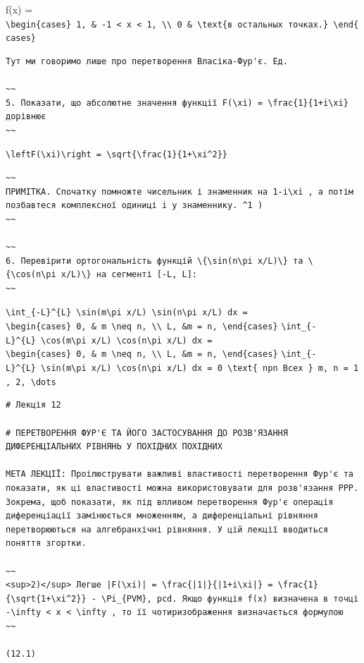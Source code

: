 \documentclass[
  ukrainian,
]{article}
\begin{document}
f(x) =
\texttt{\textbackslash{}begin\{cases\}\ 1,\ \&\ -1\ \textless{}\ x\ \textless{}\ 1,\ \textbackslash{}\textbackslash{}\ 0\ \&\ \textbackslash{}text\{в\ остальных\ точках.\}\ \textbackslash{}end\{cases\}}

\begin{verbatim}
Тут ми говоримо лише про перетворення Власіка-Фур'є. Ед.

~~
5. Показати, що абсолютне значення функції F(\xi) = \frac{1}{1+i\xi} дорівнює
~~
\end{verbatim}

\texttt{\textbackslash{}left\textbar{}F(\textbackslash{}xi)\textbackslash{}right\textbar{}\ =\ \textbackslash{}sqrt\{\textbackslash{}frac\{1\}\{1+\textbackslash{}xi\^{}2\}\}}

\begin{verbatim}
~~
ПРИМІТКА. Спочатку помножте чисельник і знаменник на 1-i\xi , а потім позбавтеся комплексної одиниці i у знаменнику. ^1 )
~~

~~
6. Перевірити ортогональність функцій \{\sin(n\pi x/L)\} та \{\cos(n\pi x/L)\} на сегменті [-L, L]:
~~
\end{verbatim}

\texttt{\textbackslash{}int\_\{-L\}\^{}\{L\}\ \textbackslash{}sin(m\textbackslash{}pi\ x/L)\ \textbackslash{}sin(n\textbackslash{}pi\ x/L)\ dx\ =}
\texttt{\textbackslash{}begin\{cases\}\ 0,\ \&\ m\ \textbackslash{}neq\ n,\ \textbackslash{}\textbackslash{}\ L,\ \&m\ =\ n,\ \textbackslash{}end\{cases\}}
\texttt{\textbackslash{}int\_\{-L\}\^{}\{L\}\ \textbackslash{}cos(m\textbackslash{}pi\ x/L)\ \textbackslash{}cos(n\textbackslash{}pi\ x/L)\ dx\ =}
\texttt{\textbackslash{}begin\{cases\}\ 0,\ \&\ m\ \textbackslash{}neq\ n,\ \textbackslash{}\textbackslash{}\ L,\ \&m\ =\ n,\ \textbackslash{}end\{cases\}}
\texttt{\textbackslash{}int\_\{-L\}\^{}\{L\}\ \textbackslash{}sin(m\textbackslash{}pi\ x/L)\ \textbackslash{}cos(n\textbackslash{}pi\ x/L)\ dx\ =\ 0\ \textbackslash{}text\{\ npn\ Bcex\ \}\ m,\ n\ =\ 1,\ 2,\ \textbackslash{}dots}

\begin{verbatim}
# Лекція 12

# ПЕРЕТВОРЕННЯ ФУР'Є ТА ЙОГО ЗАСТОСУВАННЯ ДО РОЗВ'ЯЗАННЯ ДИФЕРЕНЦІАЛЬНИХ РІВНЯНЬ У ПОХІДНИХ ПОХІДНИХ

МЕТА ЛЕКЦІЇ: Проілюструвати важливі властивості перетворення Фур'є та показати, як ці властивості можна використовувати для розв'язання PPP. Зокрема, щоб показати, як під впливом перетворення Фур'є операція диференціації замінюється множенням, а диференціальні рівняння перетворюються на алгебранхічні рівняння. У цій лекції вводиться поняття згортки.

~~
<sup>2)</sup> Легше |F(\xi)| = \frac{|1|}{|1+i\xi|} = \frac{1}{\sqrt{1+\xi^2}} - \Pi_{PVM}, pcd. Якщо функція f(x) визначена в точці -\infty < x < \infty , то її чотиризображення визначається формулою
~~

(12.1)
\end{verbatim}
\end{document}
